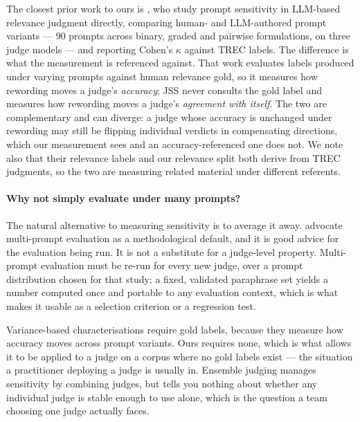 The closest prior work to ours is \citet{arabzadeh2025human}, who study prompt
sensitivity in LLM-based relevance judgment directly, comparing human- and
LLM-authored prompt variants --- 90 prompts across binary, graded and pairwise
formulations, on three judge models --- and reporting Cohen's $\kappa$ against
TREC labels. The difference is what the measurement is referenced against. That
work evaluates labels produced under varying prompts against human relevance
gold, so it measures how rewording moves a judge's \emph{accuracy}; JSS never
consults the gold label and measures how rewording moves a judge's
\emph{agreement with itself}. The two are complementary and can diverge: a judge
whose accuracy is unchanged under rewording may still be flipping individual
verdicts in compensating directions, which our measurement sees and an
accuracy-referenced one does not. We note also that their relevance labels and
our relevance split both derive from TREC judgments, so the two are measuring
related material under different referents.

\paragraph{Why not simply evaluate under many prompts?}
The natural alternative to measuring sensitivity is to average it away.
\citet{mizrahi2024state} advocate multi-prompt evaluation as a methodological
default, and it is good advice for the evaluation being run. It is not a
substitute for a judge-level property. Multi-prompt evaluation must be re-run for
every new judge, over a prompt distribution chosen for that study; a fixed,
validated paraphrase set yields a number computed once and portable to any
evaluation context, which is what makes it usable as a selection criterion or a
regression test.

Variance-based characterisations \citep{sclar2024quantifying, zhuo2024prosa}
require gold labels, because they measure how accuracy moves across prompt
variants. Ours requires none, which is what allows it to be applied to a judge on
a corpus where no gold labels exist --- the situation a practitioner deploying a
judge is usually in. Ensemble judging \citep{li2024llms} manages sensitivity by
combining judges, but tells you nothing about whether any individual judge is
stable enough to use alone, which is the question a team choosing one judge
actually faces.

